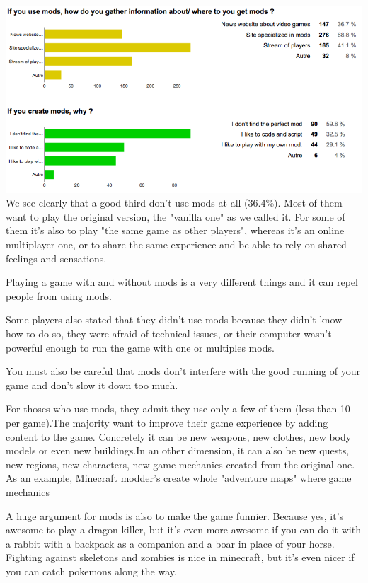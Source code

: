 \documentclass[a4paper,12pt]{article}
\begin{document}
\includegraphics[keepaspectratio=true, width=13.7cm]{./uberCharts3.png}\\

We see clearly that a good third don't use mods at all (36.4\%). Most of them want to play the original version, the "vanilla one" as we called it. For some of them it's also to play "the same game as other players", whereas it's an online multiplayer one, or to share the same experience and be able to rely on shared feelings and sensations.

Playing a game with and without mods is a very different things and it can repel people from using mods.

Some players also stated that they didn't use mods because they didn't know how to do so, they were afraid of technical issues, or their computer wasn't powerful enough to run the game with one or multiples mods.

You must also be careful that mods don't interfere with the good running of your game and don't slow it down too much.

For thoses who use mods, they admit they use only a few of them (less than 10 per game).The majority want to improve their game experience by adding content to the game. Concretely it can be new weapons, new clothes, new body models or even new buildings.In an other dimension, it can also be new quests, new regions, new characters, new game mechanics created from the original one. As an example, Minecraft modder's create whole "adventure maps" where game mechanics

A huge argument for mods is also to make the game funnier. Because yes, it's awesome to play a dragon killer, but it's even more awesome if you can do it with a rabbit with a backpack as a companion and a boar in place of your horse. Fighting against skeletons and zombies is nice in minecraft, but it's even nicer if you can catch pokemons along the way.
\end{document}
